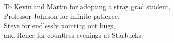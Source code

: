 
\begin{dedication}
\null\vfil
{\large
\begin{center}
To Kevin and Martin for adopting a stray grad student,\\\vspace{12pt}
Professor Johnson for infinite patience,\\\vspace{12pt}
Steve for endlessly pointing out bugs,\\\vspace{12pt}
and Renee for countless evenings at Starbucks.
\end{center}}
\vfil\null
\end{dedication}
